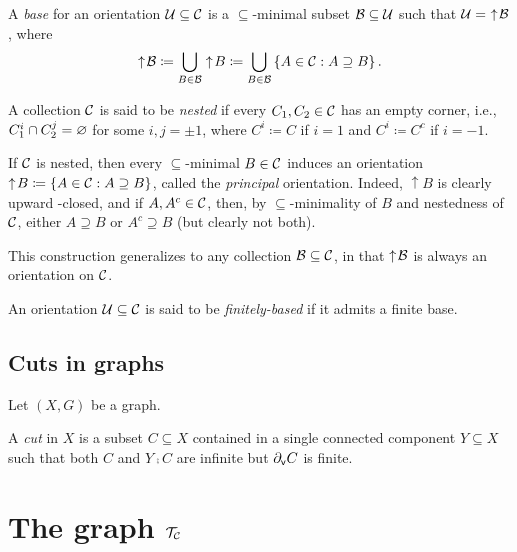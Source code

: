 \documentclass{amsart}
\begin{document}
    \begin{definition}
        A \textit{base} for an orientation $\mc{U}\subseteq\mc{C}$ is a $\subseteq$-minimal subset $\mc{B}\subseteq\mc{U}$ such that $\mc{U}=\,\,\uparrow\!\mc{B}$, where
        \begin{equation*}
            \uparrow\!\mc{B}\coloneqq\bigcup_{B\in\mc{B}}\uparrow\!B\coloneqq\bigcup_{B\in\mc{B}}\l\{A\in\mc{C}\st A\supseteq B\r\}.
        \end{equation*}
    \end{definition}

    \begin{definition}
        A collection $\mc{C}$ is said to be \textit{nested} if every $C_1,C_2\in\mc{C}$ has an empty corner, i.e., $C_1^i\cap C_2^j=\em$ for some $i,j=\pm1$, where $C^i\coloneqq C$ if $i=1$ and $C^i\coloneqq C^c$ if $i=-1$.
    \end{definition}

    \begin{remark}
        If $\mc{C}$ is nested, then every $\subseteq$-minimal $B\in\mc{C}$ induces an orientation $\uparrow\!B\coloneqq\l\{A\in\mc{C}\st A\supseteq B\r\}$, called the \textit{principal} orientation. Indeed, $\uparrow\!B$ is clearly upward -closed, and if $A,A^c\in\mc{C}$, then, by $\subseteq$-minimality of $B$ and nestedness of $\mc{C}$, either $A\supseteq B$ or $A^c\supseteq B$ (but clearly not both).

        This construction generalizes to any collection $\mc{B}\subseteq\mc{C}$, in that $\uparrow\!\mc{B}$ is always an orientation on $\mc{C}$.
    \end{remark}

    \begin{definition}
        An orientation $\mc{U}\subseteq\mc{C}$ is said to be \textit{finitely-based} if it admits a finite base.
    \end{definition}

    \subsection{Cuts in graphs}

    Let $(X,G)$ be a graph.

    \begin{definition}
        A \textit{cut} in $X$ is a subset $C\subseteq X$ contained in a single connected component $Y\subseteq X$ such that both $C$ and $Y\comp C$ are infinite but $\del_\mathsf{v}C$ is finite.
    \end{definition}

    \section{The graph $\mc{T}_\mc{C}$}
\end{document}
